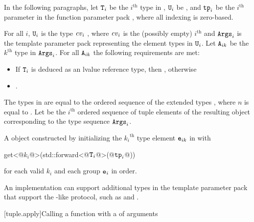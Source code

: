 \begin{itemdescr}  %
\pnum
In the following paragraphs, let $\texttt{T}_i$ be the $i^\text{th}$ type in ,
$\texttt{U}_i$ be , and $\texttt{tp}_i$ be the $i^\text{th}$
parameter in the function parameter pack , where all indexing is
zero-based.

\pnum
\expects
For all $i$, $\texttt{U}_i$ is the type
$\cv_i$ , where $\cv_i$ is the (possibly empty) $i^\text{th}$
 and $\texttt{Args}_i$ is the template parameter pack representing the element
types in $\texttt{U}_i$. Let $\texttt{A}_{ik}$ be the ${k}^\text{th}$ type in $\texttt{Args}_i$. For all
$\texttt{A}_{ik}$ the following requirements are met:
\begin{itemize}
\item If $\texttt{T}_i$ is deduced as an lvalue reference type, then
      , otherwise
\item {}.
\end{itemize}

\pnum
\remarks
The types in  are equal to the ordered
sequence of the extended types
,
where $n$ is
equal to . Let  be the $i^\text{th}$
ordered sequence of tuple elements of the resulting  object
corresponding to the type sequence $\texttt{Args}_i$.

\pnum
\returns
A  object constructed by initializing the ${k_i}^\text{th}$
type element $\texttt{e}_{ik}$ in  with
\begin{codeblock}
get<@$k_i$@>(std::forward<@$\texttt{T}_i$@>(@$\texttt{tp}_i$@))
\end{codeblock}
for each valid $k_i$ and each group $\texttt{e}_i$ in order.

\pnum
\begin{note}
An implementation can support additional types in the template parameter
pack  that support the -like protocol, such as
 and .
\end{note}
\end{itemdescr}

[tuple.apply]{Calling a function with a  of arguments}

